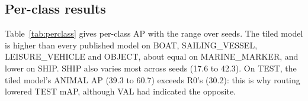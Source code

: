 \begin{table}[t]
\centering
\caption{TEST results. Ours: mean of three seeds. R0: our R50 reproduction (single run). Paper rows are taken from the SeaClips paper and its supplement (own pipeline).}
\label{tab:variants}
\small
{}
\end{table}

\subsection{Per-class results}
Table~\ref{tab:perclass} gives per-class AP with the range over seeds. The tiled model is higher than every published model on BOAT, SAILING\_VESSEL, LEISURE\_VEHICLE and OBJECT, about equal on MARINE\_MARKER, and lower on SHIP. SHIP also varies most across seeds (17.6 to 42.3). On TEST, the tiled model's ANIMAL AP (39.3 to 60.7) exceeds R0's (30.2): this is why routing lowered TEST mAP, although VAL had indicated the opposite.

